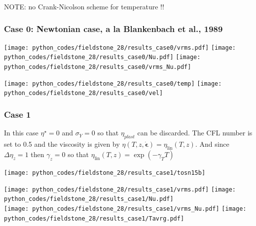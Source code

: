 NOTE: no Crank-Nicolson scheme for temperature !!

\subsubsection*{Case 0: Newtonian case, a la Blankenbach et al., 1989}

\texttt{[image: python\_codes/fieldstone\_28/results\_case0/vrms.pdf]}
\texttt{[image: python\_codes/fieldstone\_28/results\_case0/Nu.pdf]}
\texttt{[image: python\_codes/fieldstone\_28/results\_case0/vrms\_Nu.pdf]}

\texttt{[image: python\_codes/fieldstone\_28/results\_case0/temp]}
\texttt{[image: python\_codes/fieldstone\_28/results\_case0/vel]}



\newpage %
\subsubsection*{Case 1}

In this case $\eta^\star=0$ and $\sigma_Y=0$ so that $\eta_{plast}$ can be discarded.
The CFL number is set to 0.5 and the viscosity is given by 
$\eta(T,z,\dot{\boldsymbol{\epsilon}}) =   \eta_\text{lin}(T,z) $.
And since $\Delta \eta_z=1$ then $\gamma_z=0$ so that
$\eta_\text{lin} (T,z) = \exp(-\gamma_T T )$

\begin{center}
\texttt{[image: python\_codes/fieldstone\_28/results\_case1/tosn15b]}
\end{center}

\begin{center}
\texttt{[image: python\_codes/fieldstone\_28/results\_case1/vrms.pdf]}
\texttt{[image: python\_codes/fieldstone\_28/results\_case1/Nu.pdf]}\\
\texttt{[image: python\_codes/fieldstone\_28/results\_case1/vrms\_Nu.pdf]}
\texttt{[image: python\_codes/fieldstone\_28/results\_case1/Tavrg.pdf]}
\end{center}

